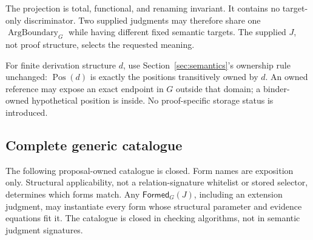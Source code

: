 \documentclass[11pt,twoside]{article}
\newcommand{\Formed}{\mathsf{Formed}}
\begin{document}
The projection is total, functional, and renaming invariant.  It contains no
target-only discriminator.  Two supplied judgments may therefore share one
\(\operatorname{ArgBoundary}_G\) while having different fixed semantic targets.
The supplied \(J\), not proof structure, selects the requested meaning.

For finite derivation structure \(d\), use Section~\ref{sec:semantics}'s ownership
rule unchanged: \(\operatorname{Pos}(d)\) is exactly the positions transitively
owned by \(d\).  An owned reference may expose an exact endpoint in \(G\) outside
that domain; a binder-owned hypothetical position is inside.  No proof-specific
storage status is introduced.

\subsection{Complete generic catalogue}

The following proposal-owned catalogue is closed.  Form names are exposition only.
Structural applicability, not a relation-signature whitelist or stored selector,
determines which forms match.
Any \(\Formed_G(J)\), including an extension judgment, may instantiate every form
whose structural parameter and evidence equations fit it.  The catalogue is
closed in checking algorithms, not in semantic judgment signatures.
\end{document}
